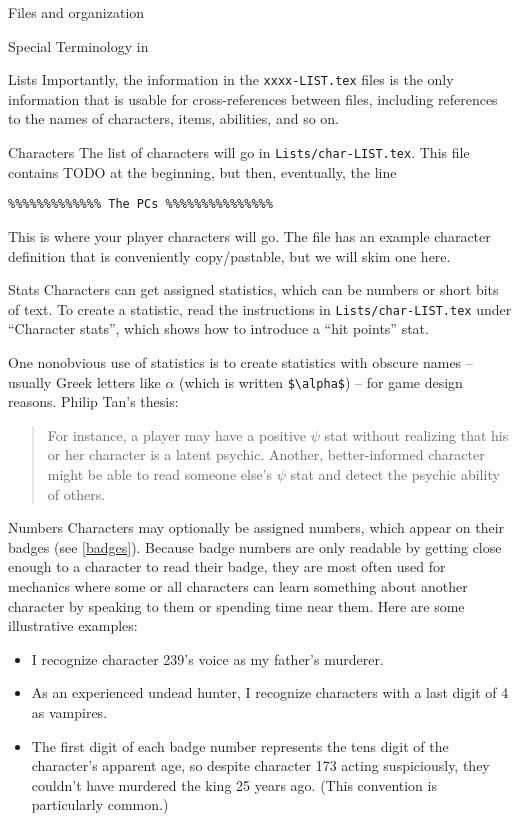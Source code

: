 \documentclass[sheet]{GameTexBase}
\begin{document}
\begin{section}{Files and organization}
\begin{subsection}{Special Terminology in \gametex{}}
\begin{subsubsection}{Lists}
Importantly, the information in the \lstinline{xxxx-LIST.tex} files is the only information that is usable for cross-references between files, including references to the names of characters, items, abilities, and so on.
\end{subsubsection}
\end{subsection}
\begin{subsection}{Characters}
\label{charlist}
The list of characters will go in \lstinline|Lists/char-LIST.tex|.  This file contains TODO at the beginning, but then, eventually, the line
\begin{verbatim}
%%%%%%%%%%%%% The PCs %%%%%%%%%%%%%%%
\end{verbatim}

This is where your player characters will go.  The file has an example character definition that is conveniently copy/pastable, but we will skim one here.

\begin{subsubsection}{Stats}
Characters can get assigned statistics, which can be numbers or short bits of text.  To create a statistic, read the instructions in \lstinline|Lists/char-LIST.tex| under ``Character stats'', which shows how to introduce a ``hit points'' stat.

One nonobvious use of statistics is to create statistics with obscure names -- usually Greek letters like $\alpha$ (which is written \lstinline|$\alpha$|) -- for game design reasons.  Philip Tan's thesis:
\begin{quote}
For instance, a player may have a positive $\psi$ stat without realizing that his
or her character is a latent psychic. Another, better-informed character might be able to
read someone else’s $\psi$ stat and detect the psychic ability of others.
\end{quote}
\end{subsubsection}
\begin{subsubsection}{Numbers}
Characters may optionally be assigned numbers, which appear on their badges (see \ref{badges}). Because badge numbers are only readable by getting close enough to a character to read their badge,
they are most often used for mechanics where some or all characters can learn something about another character by speaking to them or spending time near them.  Here are some illustrative examples:
\begin{itemize}
\item I recognize character 239's voice as my father's murderer.
\item As an experienced undead hunter, I recognize characters with a last digit of 4 as vampires.
\item The first digit of each badge number represents the tens digit of the character's apparent age, so despite character 173 acting suspiciously, they couldn't have murdered the king 25 years ago.  (This convention is particularly common.)
\end{itemize}


\end{subsubsection}
\end{subsection}
\end{section}
\end{document}
